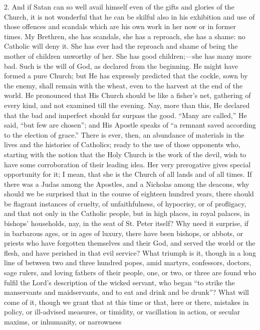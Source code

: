 2. And if Satan can so well avail himself even of the
gifts and glories of the Church, it is not wonderful that
he can be skilful also in his exhibition and use of those
offences and scandals which are his own work in her now
or in former times. My Brethren, she has scandals, she
has a reproach, she has a shame: no Catholic will deny
it. She has ever had the reproach and shame of being the
mother of children unworthy of her. She has good
children;—she has many more bad. Such is the will of
God, as declared from the beginning. He might have formed
a pure Church; but He has expressly predicted that the
cockle, sown by the enemy, shall remain with the wheat,
even to the harvest at the end of the world. He
pronounced that His Church should be like a fisher's net,
gathering of every kind, and not examined till the
evening. Nay, more than this, He declared that the bad
and imperfect should far surpass the good. ``Many are
called,'' He said, ``but few are chosen'';
and His Apostle speaks of ``a remnant saved according
to the election of grace.'' There is ever, then, an
abundance of materials in the lives and the histories of
Catholics; ready to the use of those opponents who,
starting with the notion that the Holy Church is the work
of the devil, wish to have some corroboration of their
leading idea. Her very prerogative gives special
opportunity for it; I mean, that she is the Church of all
lands and of all times. If there was a Judas among the
Apostles, and a Nicholas among the deacons, why should we
be surprised that in the course of eighteen hundred
years, there should be flagrant instances of cruelty, of
unfaithfulness, of hypocrisy, or of profligacy, and that
not only in the Catholic people, but in high places, in
royal palaces, in bishops' households, nay, in the seat
of St. Peter itself? Why need it surprise, if in
barbarous ages, or in ages of luxury, there have been
bishops, or abbots, or priests who have forgotten
themselves and their God, and served the world or the
flesh, and have perished in that evil service? What
triumph is it, though in a long line of between two and
three hundred popes, amid martyrs, confessors, doctors,
sage rulers, and loving fathers of their people, one, or
two, or three are found who fulfil the Lord's description
of the wicked servant, who began ``to strike the
manservants and maidservants, and to eat and drink and be
drunk''? What will come of it, though we grant that
at this time or that, here or there, mistakes in policy,
or ill-advised measures, or timidity, or vacillation in
action, or secular maxims, or inhumanity, or narrowness
